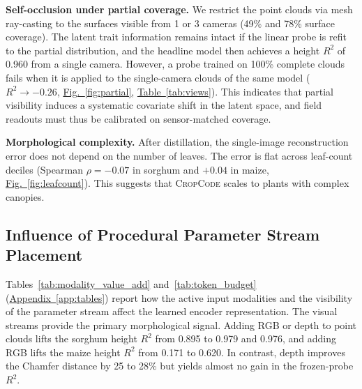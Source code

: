 \documentclass[10pt,twocolumn,letterpaper]{article}
\newcommand{\figref}[1]{\hyperref[#1]{Fig.~\ref*{#1}}}
\newcommand{\tabref}[1]{\hyperref[#1]{Table~\ref*{#1}}}
\newcommand{\appendixref}[1]{\hyperref[#1]{Appendix~\ref*{#1}}}
\newcommand{\method}{\textup{\textsc{CropCode}}}   %
\begin{document}
\noindent\textbf{Self-occlusion under partial coverage.}
We restrict the point clouds via mesh ray-casting to the surfaces visible from 1 or 3 cameras (49\% and 78\% surface coverage). The latent trait information remains intact if the linear probe is refit to the partial distribution, and the headline model then achieves a height $R^2$ of 0.960 from a single camera. However, a probe trained on 100\% complete clouds fails when it is applied to the single-camera clouds of the same model ($R^2 \to -0.26$, \figref{fig:partial}, \tabref{tab:views}). This indicates that partial visibility induces a systematic covariate shift in the latent space, and field readouts must thus be calibrated on sensor-matched coverage.

\noindent\textbf{Morphological complexity.}
After distillation, the single-image reconstruction error does not depend on the number of leaves. The error is flat across leaf-count deciles (Spearman $\rho = -0.07$ in sorghum and $+0.04$ in maize, \figref{fig:leafcount}). This suggests that \method{} scales to plants with complex canopies.

\subsection{Influence of Procedural Parameter Stream Placement}
\label{sec:param-stream}\label{sec:exp-params}

\textcolor{cvprblue}{Tables}~\ref{tab:modality_value_add} and~\ref{tab:token_budget} (\appendixref{app:tables}) report how the active input modalities and the visibility of the parameter stream affect the learned encoder representation. The visual streams provide the primary morphological signal. Adding RGB or depth to point clouds lifts the sorghum height $R^2$ from 0.895 to 0.979 and 0.976, and adding RGB lifts the maize height $R^2$ from 0.171 to 0.620. In contrast, depth improves the Chamfer distance by 25 to 28\% but yields almost no gain in the frozen-probe $R^2$.
\end{document}
